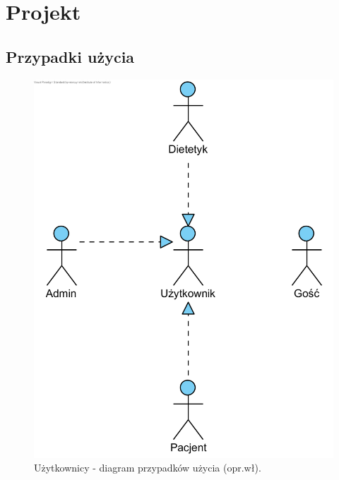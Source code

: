 \chapter{Projekt}\label{ch:project}

\section{Przypadki użycia}\label{sec:usecase}

\begin{minipage}{\textwidth}
    \begin{figure}[H]
        \centering\includegraphics[scale=0.55]{../uml/use_case_diagrams/users.png}
        \caption{Użytkownicy - diagram przypadków użycia (opr.wł).}\label{rysunek:use-case-diagram-users}
    \end{figure}
\end{minipage}

